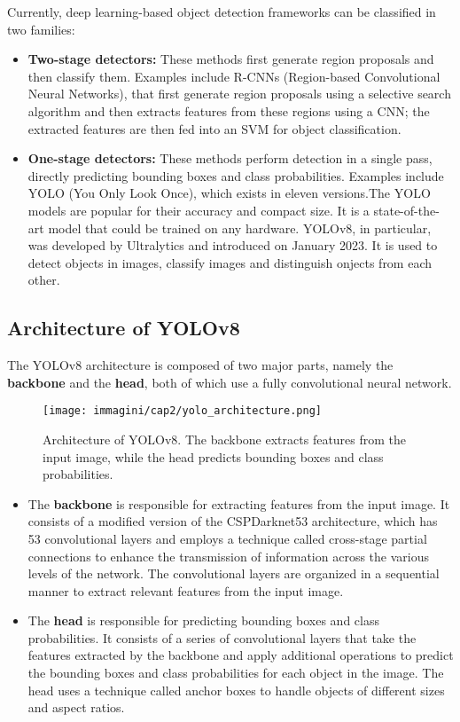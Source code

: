 Currently, deep learning-based object detection frameworks can be classified in two families: 
\begin{itemize}
    \item \textbf{Two-stage detectors:} These methods first generate region proposals and then classify them. Examples include R-CNNs (Region-based Convolutional Neural Networks), that first generate region proposals using a selective search algorithm and then extracts features from these regions using a CNN; the extracted features are then fed into an SVM for object classification. 
    \item \textbf{One-stage detectors:} These methods perform detection in a single pass, directly predicting bounding boxes and class probabilities. Examples include YOLO (You Only Look Once), which exists in eleven versions.The YOLO models are popular for their accuracy and compact size. It is a state-of-the-art model that could be trained on any hardware. YOLOv8, in particular, was developed by Ultralytics and introduced on January 2023. It is used to detect objects in images, classify images and distinguish onjects from each other. 

\end{itemize}

\subsection{Architecture of YOLOv8}
The YOLOv8 architecture is composed of two major parts, namely the \textbf{backbone} and the \textbf{head}, both of which use a fully convolutional neural network. 
\begin{figure}
    \centering
    \texttt{[image: immagini/cap2/yolo\_architecture.png]}
    \caption{Architecture of YOLOv8. The backbone extracts features from the input image, while the head predicts bounding boxes and class probabilities.}
    \label{fig:yolo_architecture}
\end{figure}
\begin{itemize}
    \item The \textbf{backbone} is responsible for extracting features from the input image. It consists of a modified version of the CSPDarknet53 architecture, which has 53 convolutional layers and employs a technique called cross-stage partial connections to enhance the transmission of information across the various levels of the network. The convolutional layers are organized in a sequential manner to extract relevant features from the input image.
    \item The \textbf{head} is responsible for predicting bounding boxes and class probabilities. It consists of a series of convolutional layers that take the features extracted by the backbone and apply additional operations to predict the bounding boxes and class probabilities for each object in the image. The head uses a technique called anchor boxes to handle objects of different sizes and aspect ratios.
\end{itemize}


